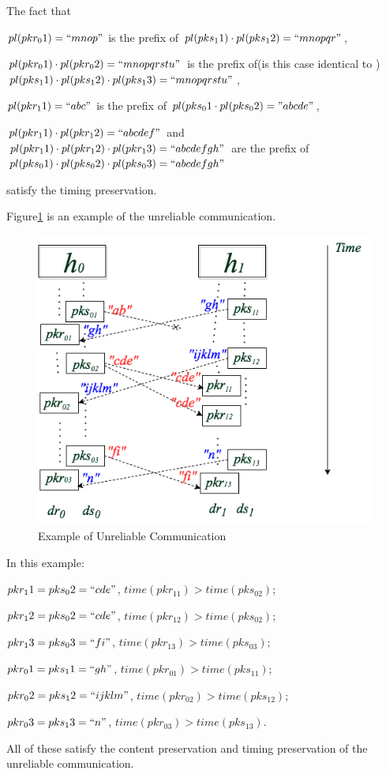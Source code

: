 The fact that
 
$pl(pkr_01) = ``mnop"$ is the prefix of $pl(pks_11) \cdot  pl(pks_12) = ``mnopqr"$,

$pl(pkr_01) \cdot pl(pkr_02)=``mnopqrstu"$ is the prefix of(is this case identical to ) $pl(pks_11) \cdot pl(pks_12) \cdot pl(pks_13) = ``mnopqrstu" $,  

$pl(pkr_11)=``abc"$ is the prefix of $pl(pks_01 \cdot pl(pks_02) = "abcde"$,  

$pl(pkr_11) \cdot pl(pkr_12)= ``abcdef"$ and  $pl(pkr_11) \cdot pl(pkr_12) \cdot pl(pkr_13) = ``abcdefgh"$ are  the prefix of  $pl(pks_01) \cdot pl(pks_02) \cdot pl(pks_03)= ``abcdefgh"$

satisfy the timing preservation. 


Figure\ref{unreliableexample} is an example of the unreliable communication. 

\begin{figure}[H]
\centerline{\includegraphics[scale=0.55]{Figures/unreliableexample}}
\caption{Example of Unreliable Communication}
\label{unreliableexample}
\end{figure}

In this example:

$pkr_11 = pks_02=``cde"$, $time(pkr_11) > time(pks_02)$; 

$pkr_12 = pks_02=``cde"$, $time(pkr_12) > time(pks_02)$; 

$pkr_13 = pks_03=``fi"$, $time(pkr_13) > time(pks_03)$;

$pkr_01 = pks_11=``gh"$, $time(pkr_01) > time(pks_11)$;

$pkr_02 = pks_12=``ijklm"$, $time(pkr_02) > time(pks_12)$;

$pkr_03 = pks_13=``n"$, $time(pkr_03) > time(pks_13)$.

All of these satisfy the content preservation and timing preservation of the unreliable communication.

